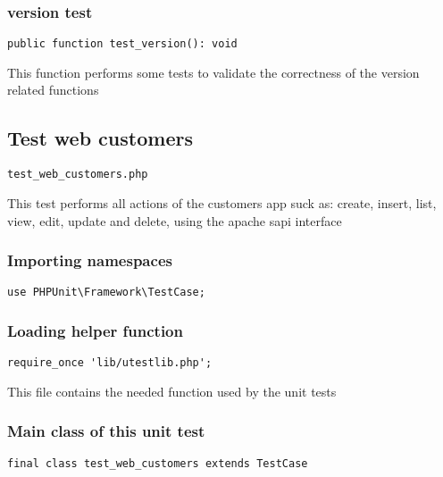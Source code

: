 \documentclass[a4paper]{article}
\begin{document}
\hypertarget{toc391}{}
\subsubsection{version test}

\begin{lstlisting}
public function test_version(): void
\end{lstlisting}

This function performs some tests to validate the correctness
of the version related functions

\hypertarget{toc392}{}
\subsection{Test web customers}

\begin{lstlisting}
test_web_customers.php
\end{lstlisting}

This test performs all actions of the customers app suck as: create, insert,
list, view, edit, update and delete, using the apache sapi interface

\hypertarget{toc393}{}
\subsubsection{Importing namespaces}

\begin{lstlisting}
use PHPUnit\Framework\TestCase;
\end{lstlisting}

\hypertarget{toc394}{}
\subsubsection{Loading helper function}

\begin{lstlisting}
require_once 'lib/utestlib.php';
\end{lstlisting}

This file contains the needed function used by the unit tests

\hypertarget{toc395}{}
\subsubsection{Main class of this unit test}

\begin{lstlisting}
final class test_web_customers extends TestCase
\end{lstlisting}
\end{document}
